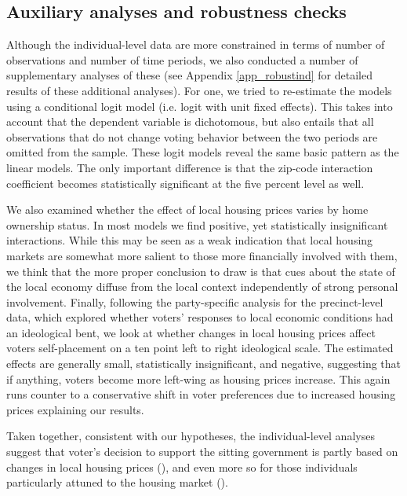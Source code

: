 \documentclass[12pt,a4paper]{article}
\begin{document}
	
	\subsection{Auxiliary analyses and robustness checks}
	
	Although the individual-level data are more constrained in terms of number of observations and number of time periods, we also conducted a number of supplementary analyses of these (see Appendix \ref{app_robustind} for detailed results of these additional analyses). For one, we tried to re-estimate the models using a conditional logit model (i.e. logit with unit fixed effects). This takes into account that the dependent variable is dichotomous, but also entails that all observations that do not change voting behavior between the two periods are omitted from the sample. These logit models reveal the same basic pattern as the linear models. The only important difference is that the zip-code interaction coefficient becomes statistically significant at the five percent level as well. 
	
	We also examined whether the effect of local housing prices varies by home ownership status. In most models we find positive, yet statistically insignificant interactions. While this may be seen as a weak indication that local housing markets are somewhat more salient to those more financially involved with them, we think that the more proper conclusion to draw is that cues about the state of the local economy diffuse from the local context independently of strong personal involvement. 
	Finally, following the party-specific analysis for the precinct-level data, which explored whether voters’ responses to local economic conditions had an ideological bent, we look at whether changes in local housing prices affect voters self-placement on a ten point left to right ideological scale. The estimated effects are generally small, statistically insignificant, and negative, suggesting that if anything, voters become more left-wing as housing prices increase. This again runs counter to a conservative shift in voter preferences due to increased housing prices explaining our results.
	
	Taken together, consistent with our hypotheses, the individual-level analyses suggest that voter’s decision to support the sitting government is partly based on changes in local housing prices (\hone), and even more so for those individuals particularly attuned to the housing market (\htwo). 
	
\end{document}
